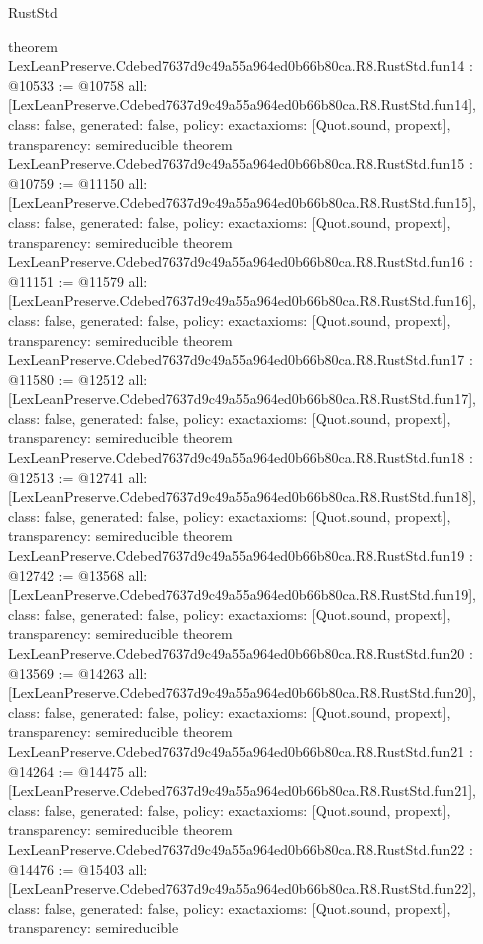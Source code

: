 \begin{lexlean}{RustStd}
\begin{coremodule}
{}
theorem LexLeanPreserve.Cdebed7637d9c49a55a964ed0b66b80ca.R8.RustStd.fun14 : @10533 := @10758 {
  all: [LexLeanPreserve.Cdebed7637d9c49a55a964ed0b66b80ca.R8.RustStd.fun14],
  class: false,
  generated: false,
  policy: exact{axioms: [Quot.sound, propext]},
  transparency: semireducible
}
theorem LexLeanPreserve.Cdebed7637d9c49a55a964ed0b66b80ca.R8.RustStd.fun15 : @10759 := @11150 {
  all: [LexLeanPreserve.Cdebed7637d9c49a55a964ed0b66b80ca.R8.RustStd.fun15],
  class: false,
  generated: false,
  policy: exact{axioms: [Quot.sound, propext]},
  transparency: semireducible
}
theorem LexLeanPreserve.Cdebed7637d9c49a55a964ed0b66b80ca.R8.RustStd.fun16 : @11151 := @11579 {
  all: [LexLeanPreserve.Cdebed7637d9c49a55a964ed0b66b80ca.R8.RustStd.fun16],
  class: false,
  generated: false,
  policy: exact{axioms: [Quot.sound, propext]},
  transparency: semireducible
}
theorem LexLeanPreserve.Cdebed7637d9c49a55a964ed0b66b80ca.R8.RustStd.fun17 : @11580 := @12512 {
  all: [LexLeanPreserve.Cdebed7637d9c49a55a964ed0b66b80ca.R8.RustStd.fun17],
  class: false,
  generated: false,
  policy: exact{axioms: [Quot.sound, propext]},
  transparency: semireducible
}
theorem LexLeanPreserve.Cdebed7637d9c49a55a964ed0b66b80ca.R8.RustStd.fun18 : @12513 := @12741 {
  all: [LexLeanPreserve.Cdebed7637d9c49a55a964ed0b66b80ca.R8.RustStd.fun18],
  class: false,
  generated: false,
  policy: exact{axioms: [Quot.sound, propext]},
  transparency: semireducible
}
theorem LexLeanPreserve.Cdebed7637d9c49a55a964ed0b66b80ca.R8.RustStd.fun19 : @12742 := @13568 {
  all: [LexLeanPreserve.Cdebed7637d9c49a55a964ed0b66b80ca.R8.RustStd.fun19],
  class: false,
  generated: false,
  policy: exact{axioms: [Quot.sound, propext]},
  transparency: semireducible
}
theorem LexLeanPreserve.Cdebed7637d9c49a55a964ed0b66b80ca.R8.RustStd.fun20 : @13569 := @14263 {
  all: [LexLeanPreserve.Cdebed7637d9c49a55a964ed0b66b80ca.R8.RustStd.fun20],
  class: false,
  generated: false,
  policy: exact{axioms: [Quot.sound, propext]},
  transparency: semireducible
}
theorem LexLeanPreserve.Cdebed7637d9c49a55a964ed0b66b80ca.R8.RustStd.fun21 : @14264 := @14475 {
  all: [LexLeanPreserve.Cdebed7637d9c49a55a964ed0b66b80ca.R8.RustStd.fun21],
  class: false,
  generated: false,
  policy: exact{axioms: [Quot.sound, propext]},
  transparency: semireducible
}
theorem LexLeanPreserve.Cdebed7637d9c49a55a964ed0b66b80ca.R8.RustStd.fun22 : @14476 := @15403 {
  all: [LexLeanPreserve.Cdebed7637d9c49a55a964ed0b66b80ca.R8.RustStd.fun22],
  class: false,
  generated: false,
  policy: exact{axioms: [Quot.sound, propext]},
  transparency: semireducible
}
\end{coremodule}
\end{lexlean}
